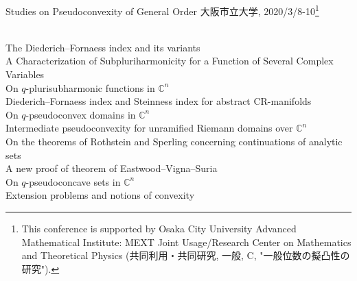 \documentclass[a4]{article}
\theoremstyle{plain} %
\theoremstyle{definition} %
\begin{document}
\begin{center}
  {\huge Studies on Pseudoconvexity of General Order}
\vskip5mm
{\large 大阪市立大学, 2020/3/8-10}\footnote{This conference is supported by Osaka City University Advanced Mathematical Institute: MEXT Joint Usage/Research Center on Mathematics and Theoretical Physics (共同利用・共同研究, 一般, C, "一般位数の擬凸性の研究"). }
\end{center}

\vskip8mm
\vskip5mm
\vskip2mm
\\
The Diederich--Fornaess index and its variants
\vskip3mm
\\
A Characterization of Subpluriharmonicity for a Function of Several Complex Variables
\vskip3mm
\\
On $q$-plurisubharmonic functions in $\mathbb{C}^n$
\vskip3mm
\\
Diederich--Fornaess index and Steinness index for abstract CR-manifolds
\vskip8mm
\vskip2mm
\\
On $q$-pseudoconvex domains in $\mathbb{C}^n$
\vskip3mm
\\
Intermediate pseudoconvexity for unramified Riemann domains over $\mathbb{C}^n$
\vskip3mm
\\
On the theorems of Rothstein and Sperling concerning continuations of analytic sets
\vskip3mm
\\
A new proof of  theorem of Eastwood--Vigna--Suria
\vskip8mm
\vskip2mm
\\
On $q$-pseudoconcave sets in $\mathbb{C}^n$
\vskip3mm
\\
Extension problems and notions of convexity


\newpage
\end{document}
